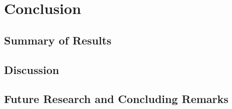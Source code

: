 \chapter{Conclusion}
\label{ch9-conclusion}

\section{Summary of Results}

\section{Discussion}

\section{Future Research and Concluding Remarks}